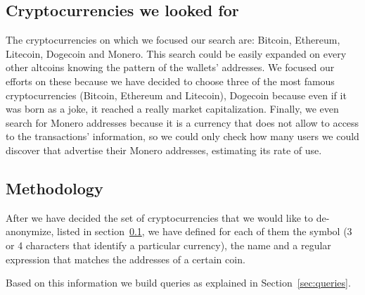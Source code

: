 \subsection{Cryptocurrencies we looked for}
\label{subsec:currencies}
The cryptocurrencies on which we focused our search are: Bitcoin, Ethereum,
Litecoin, Dogecoin and Monero. This search could be easily expanded on every
other altcoins knowing the pattern of the wallets' addresses. We focused our
efforts on these because we have decided to choose three of the most famous
cryptocurrencies (Bitcoin, Ethereum and Litecoin), Dogecoin because even if
it was born as a joke, it reached a really market capitalization. Finally, we
even search for Monero addresses because it is a currency that does not allow to
access to the transactions' information, so we could only check how many users
we could discover that advertise their Monero addresses, estimating its rate of
use.

\subsection{Methodology}
\label{sec:methodology}
After we have decided the set of cryptocurrencies that we would like to
de-anonymize, listed in section~\ref{subsec:currencies}, we have defined for
each of them the symbol (3 or 4 characters that identify a particular
currency), the name and a regular expression that matches the addresses of a
certain coin.

Based on this information we build queries as explained in
Section~\ref{sec:queries}.
